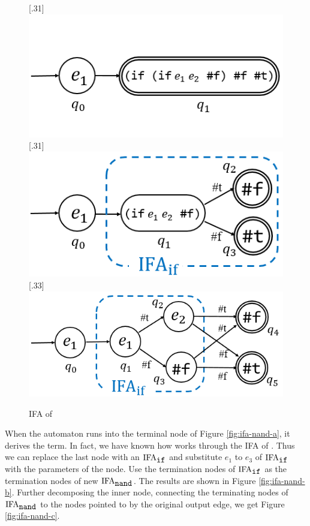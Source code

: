 \begin{figure}[t]
\centering
{}[.31\linewidth]{
    \includegraphics[scale=0.25]{images/ifa/ifa-nand-1-small.png}
}
[.31\linewidth]{
    \includegraphics[scale=0.25]{images/ifa/ifa-nand-2-small.png}
}
[.33\linewidth]{
    \includegraphics[scale=0.25]{images/ifa/ifa-nand-3-small.png}
}
\caption{IFA of }
\label{fig:ifa-nand}
\end{figure}

When the automaton runs into the terminal node of Figure \ref{fig:ifa-nand-a}, it derives the  term. In fact, we have known how  works through the IFA of . Thus we can replace the last node with an $\text{IFA}_{\mbox{\tt if}}$ and substitute $e_1$ to $e_3$ of $\text{IFA}_{\mbox{\tt if}}$ with the parameters of the node. Use the termination nodes of $\text{IFA}_{\mbox{\tt if}}$ as the termination nodes of new $\text{IFA}_{\mbox{\tt nand}}$. The results are shown in Figure \ref{fig:ifa-nand-b}. Further decomposing the inner  node, connecting the terminating nodes of $\text{IFA}_{\mbox{\tt nand}}$ to the nodes pointed to by the original output edge, we get Figure \ref{fig:ifa-nand-c}. 

